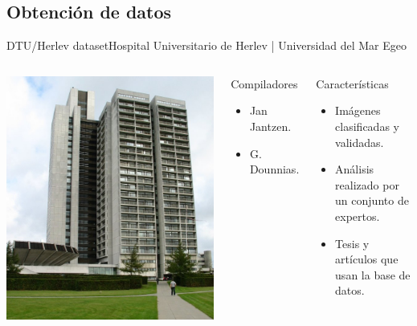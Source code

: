 \documentclass{beamer}
\begin{document}
    \subsection{Obtención de datos}
    \begin{frame}{DTU/Herlev dataset}{Hospital Universitario de Herlev | Universidad del Mar Egeo}

        \begin{columns}
            \includegraphics[width=\columnwidth,height=\columnwidth]{herlev}
    
            \begin{block}{Compiladores}{
                \begin{itemize}
                    \item Jan Jantzen.
                    \item G. Dounnias.
                \end{itemize}
            }   
            \end{block}
            \begin{exampleblock}{Características}{
                \begin{itemize}
                    \item Imágenes clasificadas y validadas.
                    \item Análisis realizado por un conjunto de expertos.
                    \item Tesis y artículos que usan la base de datos.
                \end{itemize}
            }
            \end{exampleblock}
        \end{columns}
    \end{frame}
\end{document}
